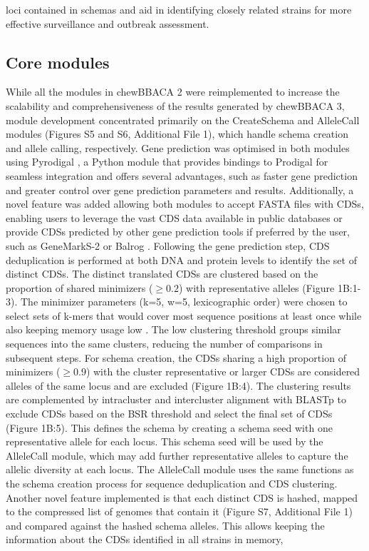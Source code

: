loci contained in schemas and aid in identifying closely related strains for more effective surveillance and outbreak assessment.


\subsection{Core modules} \label{ssec:core_modules}

While all the modules in chewBBACA 2 were reimplemented to increase the scalability and comprehensiveness of the results generated by chewBBACA 3, module development concentrated primarily on the CreateSchema and AlleleCall modules (Figures S5 and S6, Additional File 1), which handle schema creation and allele calling, respectively. Gene prediction was optimised in both modules using Pyrodigal \citep{larralde_pyrodigal_2022, hyatt_prodigal_2010}, a Python module that provides bindings to Prodigal for seamless integration and offers several advantages, such as faster gene prediction and greater control over gene prediction parameters and results. Additionally, a novel feature was added allowing both modules to accept FASTA files with CDSs, enabling users to leverage the vast CDS data available in public databases or provide CDSs predicted by other gene prediction tools if preferred by the user, such as GeneMarkS-2 or Balrog \citep{lomsadze_modeling_2018, sommer_balrog_2021}. Following the gene prediction step, CDS deduplication is performed at both DNA and protein levels to identify the set of distinct CDSs. The distinct translated CDSs are clustered based on the proportion of shared minimizers ($\geq0.2$) with representative alleles \citep{schleimer_winnowing_nodate, roberts_reducing_2004, marcais_improving_2017} (Figure 1B:1-3). The minimizer parameters (k=5, w=5, lexicographic order) were chosen to select sets of k-mers that would cover most sequence positions at least once while also keeping memory usage low \citep{zheng_improved_2020}. The low clustering threshold groups similar sequences into the same clusters, reducing the number of comparisons in subsequent steps. For schema creation, the CDSs sharing a high proportion of minimizers ($\geq0.9$) with the cluster representative or larger CDSs are considered alleles of the same locus and are excluded (Figure 1B:4). The clustering results are complemented by intracluster and intercluster alignment with BLASTp to exclude CDSs based on the BSR threshold and select the final set of CDSs (Figure 1B:5). This defines the schema by creating a schema seed with one representative allele for each locus. This schema seed will be used by the AlleleCall module, which may add further representative alleles to capture the allelic diversity at each locus. The AlleleCall module uses the same functions as the schema creation process for sequence deduplication and CDS clustering. Another novel feature implemented is that each distinct CDS is hashed, mapped to the compressed list of genomes that contain it (Figure S7, Additional File 1) and compared against the hashed schema alleles. This allows keeping the information about the CDSs identified in all strains in memory, 
